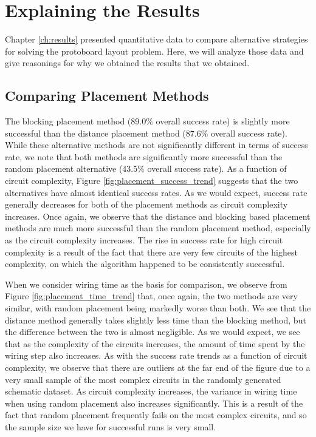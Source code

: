 \section{Explaining the Results}

Chapter \ref{ch:results} presented quantitative data to compare alternative
strategies for solving the protoboard layout problem. Here, we will
analyze those data and give reasonings for why we obtained the results
that we obtained.

\subsection{Comparing Placement Methods}

The blocking placement method ($89.0\%$ overall success rate)
is slightly more successful than the distance placement method ($87.6\%$ overall
success rate). While these alternative methods are not significantly different
in terms of success rate, we note that both methods are significantly
more successful than the random placement alternative ($43.5\%$ overall success
rate).
As a function of circuit
complexity, Figure
\ref{fig:placement_success_trend} suggests that the two alternatives have almost
identical success rates. As we would expect, success rate generally decreases
for both of the placement methods as circuit complexity increases.
Once again, we observe that the distance and blocking based placement methods
are much more successful than the random placement method, especially as the
circuit complexity increases.
The rise in success rate for high circuit complexity is a result of the fact
that there are very few circuits of the highest complexity, on which the
algorithm happened to be consistently successful.

When we consider wiring time as the basis for comparison, we observe from
Figure \ref{fig:placement_time_trend} that, once again, the two methods are
very similar, with random placement being markedly worse than both.
We see that the distance method generally takes slightly less
time than the blocking method, but the difference between the two is
almost negligible. As we would expect, we see that as the complexity
of the circuits increases, the amount of time spent by the wiring step also
increases. As with the success rate trends as a function of circuit
complexity, we observe that there are outliers at the far end of the figure due
to a very small sample of the most complex circuits in the randomly generated
schematic dataset. As circuit complexity increases, the variance in wiring time
when using random placement also increases significantly. This is a result of
the fact that random placement frequently fails on the most complex
circuits, and so the sample size we have for successful runs is very small.

